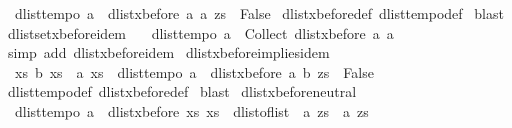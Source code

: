 \begin{isabellebody}
\ \ {\isachardoublequoteopen}dlist{\isacharunderscore}tempo{}\ a\ {\isasymLongrightarrow}\ dlist{\isacharunderscore}xbefore\ a\ a\ zs\ {\isacharequal}\ False{\isachardoublequoteclose}\isanewline
%
\isadelimproof
%
\endisadelimproof
%
\isatagproof
{}\isamarkupfalse%
\ dlist{\isacharunderscore}xbefore{\isacharunderscore}def\ dlist{\isacharunderscore}tempo{}{\isacharunderscore}def\isanewline
{}\isamarkupfalse%
\ blast%
\endisatagproof
{\isafoldproof}%
%
\isadelimproof
\isanewline
%
\endisadelimproof
\isanewline
{}\isamarkupfalse%
\ dlistset{\isacharunderscore}xbefore{\isacharunderscore}idem{\isacharcolon}\ \isanewline
\ \ {\isachardoublequoteopen}dlist{\isacharunderscore}tempo{}\ a\ {\isasymLongrightarrow}\ Collect\ {\isacharparenleft}dlist{\isacharunderscore}xbefore\ a\ a{\isacharparenright}\ {\isacharequal}\ {\isacharbraceleft}{\isacharbraceright}{\isachardoublequoteclose}\isanewline
%
\isadelimproof
%
\endisadelimproof
%
\isatagproof
{}\isamarkupfalse%
\ {\isacharparenleft}simp\ add{\isacharcolon}\ dlist{\isacharunderscore}xbefore{\isacharunderscore}idem{\isacharparenright}%
\endisatagproof
{\isafoldproof}%
%
\isadelimproof
\isanewline
%
\endisadelimproof
\isanewline
{}\isamarkupfalse%
\ dlist{\isacharunderscore}xbefore{\isacharunderscore}implies{\isacharunderscore}idem{\isacharcolon}\ \isanewline
\ \ {\isachardoublequoteopen}{\isasymforall}xs{\isachardot}\ b\ xs\ {\isasymlongrightarrow}\ a\ xs\ {\isasymLongrightarrow}\ dlist{\isacharunderscore}tempo{}\ a\ {\isasymLongrightarrow}\ dlist{\isacharunderscore}xbefore\ a\ b\ zs\ {\isacharequal}\ False{\isachardoublequoteclose}\isanewline
%
\isadelimproof
%
\endisadelimproof
%
\isatagproof
{}\isamarkupfalse%
\ dlist{\isacharunderscore}tempo{}{\isacharunderscore}def\ dlist{\isacharunderscore}xbefore{\isacharunderscore}def\isanewline
{}\isamarkupfalse%
\ blast%
\endisatagproof
{\isafoldproof}%
%
\isadelimproof
%
\endisadelimproof
%
\isamarkuptrue%
\isamarkupfalse%
\ dlist{\isacharunderscore}xbefore{\isacharunderscore}neutral{\isacharunderscore}{}{\isacharcolon}\ \isanewline
\ \ {\isachardoublequoteopen}dlist{\isacharunderscore}tempo{}\ a\ {\isasymLongrightarrow}\ dlist{\isacharunderscore}xbefore\ {\isacharparenleft}{\isasymlambda}xs{\isachardot}\ xs\ {\isacharequal}\ dlist{\isacharunderscore}of{\isacharunderscore}list\ {\isacharbrackleft}{\isacharbrackright}{\isacharparenright}\ a\ zs\ {\isacharequal}\ a\ zs{\isachardoublequoteclose}\isanewline

\end{isabellebody}
